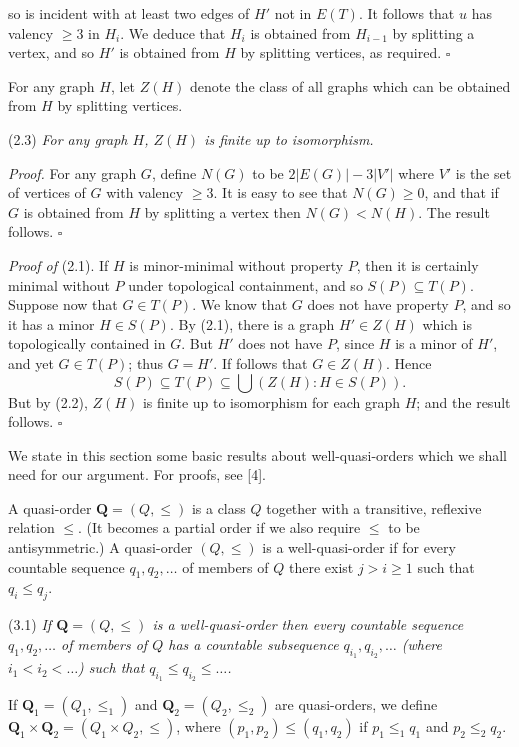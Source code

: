 \noindent so is incident with at least two edges of $H'$ not in $E(T)$. It follows that $u$ has valency $\ge 3$ in $H_i$. We deduce that $H_i$ is obtained from $H_{i-1}$ by splitting a vertex, and so $H'$ is obtained from $H$ by splitting vertices, as required. $\square$

For any graph $H$, let $Z(H)$ denote the class of all graphs which can be obtained from $H$ by splitting vertices.

\stmt
(2.3) \textit{For any graph $H$, $Z(H)$ is finite up to isomorphism.}

\textit{Proof.} For any graph $G$, define $N(G)$ to be $2 |E(G)| - 3 |V'|$ where $V'$ is the set of vertices of $G$ with valency $\ge 3$. It is easy to see that $N(G) \ge 0$, and that if $G$ is obtained from $H$ by splitting a vertex then $N(G) < N(H)$. The result follows. $\square$

\textit{Proof of} (2.1). If $H$ is minor-minimal without property $P$, then it is certainly minimal without $P$ under topological containment, and so $S(P) \subseteq T(P)$. Suppose now that $G \in T(P)$. We know that $G$ does not have property $P$, and so it has a minor $H \in S(P)$. By (2.1), there is a graph $H' \in Z(H)$ which is topologically contained in $G$. But $H'$ does not have $P$, since $H$ is a minor of $H'$, and yet $G \in T(P)$; thus $G = H'$. If follows that $G \in Z(H)$. Hence
\begin{equation*}
S(P) \subseteq T(P) \subseteq \bigcup (Z(H) : H \in S(P)).
\end{equation*}
But by (2.2), $Z(H)$ is finite up to isomorphism for each graph $H$; and the result follows. $\square$


We state in this section some basic results about well-quasi-orders which we shall need for our argument. For proofs, see [4].

A quasi-order $\mathbf{Q} = (Q, \le)$ is a class $Q$ together with a transitive, reflexive relation $\le$. (It becomes a partial order if we also require $\le$ to be antisymmetric.) A quasi-order $(Q, \le)$ is a well-quasi-order if for every countable sequence $q_1, q_2, \dots$ of members of $Q$ there exist $j > i \ge 1$ such that $q_i \le q_j$.

\stmt
(3.1) \textit{If $\mathbf{Q} = (Q, \le)$ is a well-quasi-order then every countable sequence $q_1, q_2, \dots$ of members of $Q$ has a countable subsequence $q_{i_1}, q_{i_2}, \dots$ (where $i_1 < i_2 < \dots$) such that $q_{i_1} \le q_{i_2} \le \dots$.}

If $\mathbf{Q}_1 = (Q_1, \le_1)$ and $\mathbf{Q}_2 = (Q_2, \le_2)$ are quasi-orders, we define $\mathbf{Q}_1 \times \mathbf{Q}_2 = (Q_1 \times Q_2, \le)$, where $(p_1, p_2) \le (q_1, q_2)$ if $p_1 \le_1 q_1$ and $p_2 \le_2 q_2$.
